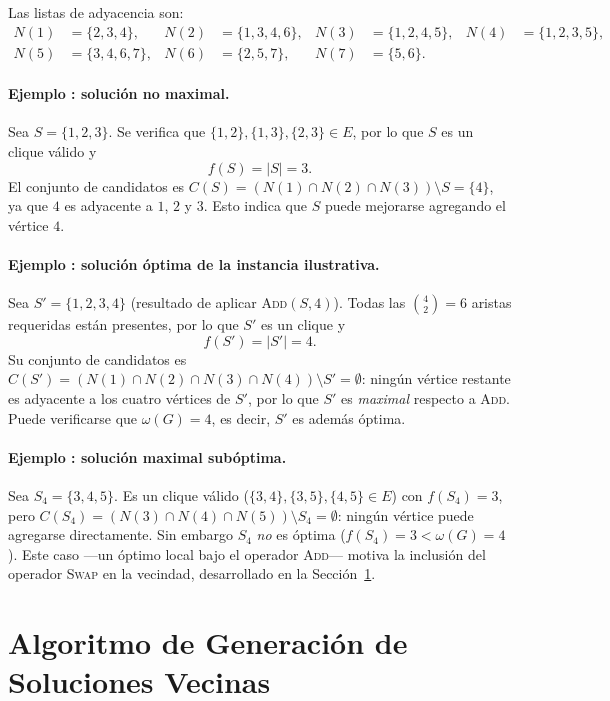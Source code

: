 \documentclass[letterpaper,12pt]{article}
\newcounter{ejemplo}
\begin{document}
Las listas de adyacencia son:
\[
\begin{aligned}
N(1)&=\{2,3,4\}, & N(2)&=\{1,3,4,6\}, & N(3)&=\{1,2,4,5\}, & N(4)&=\{1,2,3,5\},\\
N(5)&=\{3,4,6,7\}, & N(6)&=\{2,5,7\}, & N(7)&=\{5,6\}. & &
\end{aligned}
\]

\label{ex:no-maximal}
\paragraph{Ejemplo \theejemplo: solución no maximal.} Sea $S = \{1,2,3\}$. Se verifica que $\{1,2\},\{1,3\},\{2,3\} \in E$, por lo que $S$ es un clique válido y
\[
f(S) = |S| = 3.
\]
El conjunto de candidatos es $C(S) = (N(1)\cap N(2)\cap N(3)) \setminus S = \{4\}$, ya que $4$ es adyacente a $1$, $2$ y $3$. Esto indica que $S$ puede mejorarse agregando el vértice $4$.

\label{ex:optimo}
\paragraph{Ejemplo \theejemplo: solución óptima de la instancia ilustrativa.} Sea $S' = \{1,2,3,4\}$ (resultado de aplicar \textsc{Add}$(S,4)$). Todas las $\binom{4}{2}=6$ aristas requeridas están presentes, por lo que $S'$ es un clique y
\[
f(S') = |S'| = 4.
\]
Su conjunto de candidatos es $C(S') = (N(1)\cap N(2)\cap N(3)\cap N(4)) \setminus S' = \emptyset$: ningún vértice restante es adyacente a los cuatro vértices de $S'$, por lo que $S'$ es \emph{maximal} respecto a \textsc{Add}. Puede verificarse que $\omega(G)=4$, es decir, $S'$ es además óptima.

\label{ex:optimo-local}
\paragraph{Ejemplo \theejemplo: solución maximal subóptima.} Sea $S_4 = \{3,4,5\}$. Es un clique válido ($\{3,4\},\{3,5\},\{4,5\}\in E$) con $f(S_4)=3$, pero $C(S_4) = (N(3)\cap N(4)\cap N(5))\setminus S_4 = \emptyset$: ningún vértice puede agregarse directamente. Sin embargo $S_4$ \emph{no} es óptima ($f(S_4)=3 < \omega(G)=4$). Este caso —un óptimo local bajo el operador \textsc{Add}— motiva la inclusión del operador \textsc{Swap} en la vecindad, desarrollado en la Sección~\ref{sec:vecindad}.

\section{Algoritmo de Generación de Soluciones Vecinas}\label{sec:vecindad}
\end{document}
